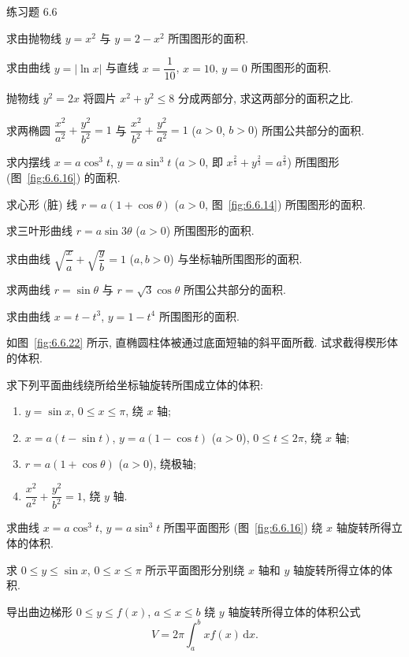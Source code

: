 \begin{exblock}{练习题 6.6}
\item 求由抛物线 $y=x^{2}$ 与 $y=2-x^{2}$ 所围图形的面积.
\item 求由曲线 $y=|\ln x|$ 与直线 $x=\dfrac{1}{10}$, $x=10$, $y=0$ 所围图形的面积.
\item 抛物线 $y^{2}=2x$ 将圆片 $x^{2}+y^{2}\leqslant8$ 分成两部分, 求这两部分的面积之比.
\item 求两椭圆 $\dfrac{x^{2}}{a^{2}}+\dfrac{y^{2}}{b^{2}}=1$ 与 $\dfrac{x^{2}}{b^{2}}+\dfrac{y^{2}}{a^{2}}=1$ ($a>0$, $b>0$) 所围公共部分的面积.
\item 求内摆线 $x=a\cos^{3}t$, $y=a\sin^{3}t$ ($a>0$, 即 $x^{\frac{2}{3}}+y^{\frac{2}{3}}=a^{\frac{2}{3}}$) 所围图形 (图~\ref{fig:6.6.16}) 的面积.
\item 求心形 (脏) 线 $r=a(1+\cos\theta)$ ($a>0$, 图~\ref{fig:6.6.14}) 所围图形的面积.
\item 求三叶形曲线 $r=a\sin3\theta$ ($a>0$) 所围图形的面积.
\item 求由曲线 $\sqrt{\dfrac{x}{a}}+\sqrt{\dfrac{y}{b}}=1$ ($a,b>0$) 与坐标轴所围图形的面积.
\item 求两曲线 $r=\sin\theta$ 与 $r=\sqrt{3}\cos\theta$ 所围公共部分的面积.
\item 求由曲线 $x=t-t^{3}$, $y=1-t^{4}$ 所围图形的面积.
\item 如图~\ref{fig:6.6.22} 所示, 直椭圆柱体被通过底面短轴的斜平面所截. 试求截得楔形体的体积.
\item 求下列平面曲线绕所给坐标轴旋转所围成立体的体积:
\begin{enumerate}[label=(\arabic*)]
\item $y=\sin x$, $0\leqslant x\leqslant\pi$, 绕 $x$ 轴;
\item $x=a(t-\sin t)$, $y=a(1-\cos t)$ ($a>0$), $0\leqslant t\leqslant2\pi$, 绕 $x$ 轴;
\item $r=a(1+\cos\theta)$ ($a>0$), 绕极轴;
\item $\dfrac{x^{2}}{a^{2}}+\dfrac{y^{2}}{b^{2}}=1$, 绕 $y$ 轴.
\end{enumerate}
\item 求曲线 $x=a\cos^{3}t$, $y=a\sin^{3}t$ 所围平面图形 (图~\ref{fig:6.6.16}) 绕 $x$ 轴旋转所得立体的体积.
\item 求 $0\leqslant y\leqslant\sin x$, $0\leqslant x\leqslant\pi$ 所示平面图形分别绕 $x$ 轴和 $y$ 轴旋转所得立体的体积.
\item 导出曲边梯形 $0\leqslant y\leqslant f(x)$, $a\leqslant x\leqslant b$ 绕 $y$ 轴旋转所得立体的体积公式
\[
V=2\pi\int_{a}^{b}xf(x)\,\mathrm{d}x.
\]
\end{exblock}
